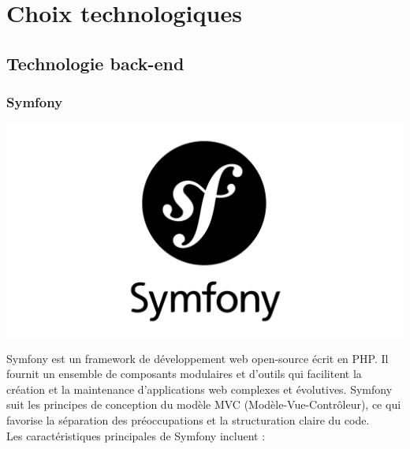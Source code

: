 \chapter{Choix technologiques}
	\section{Technologie back-end}
		\subsection{Symfony}
			\begin{center}
				\includegraphics[scale=0.3]{chap_2/symfony.png}
				\label{Symfony}
			\end{center}
			Symfony est un framework de développement web open-source écrit en PHP. Il fournit un ensemble de composants modulaires et d'outils qui facilitent la création et la maintenance d'applications web complexes et évolutives. Symfony suit les principes de conception du modèle MVC (Modèle-Vue-Contrôleur), ce qui favorise la séparation des préoccupations et la structuration claire du code.\\
			Les caractéristiques principales de Symfony incluent :
